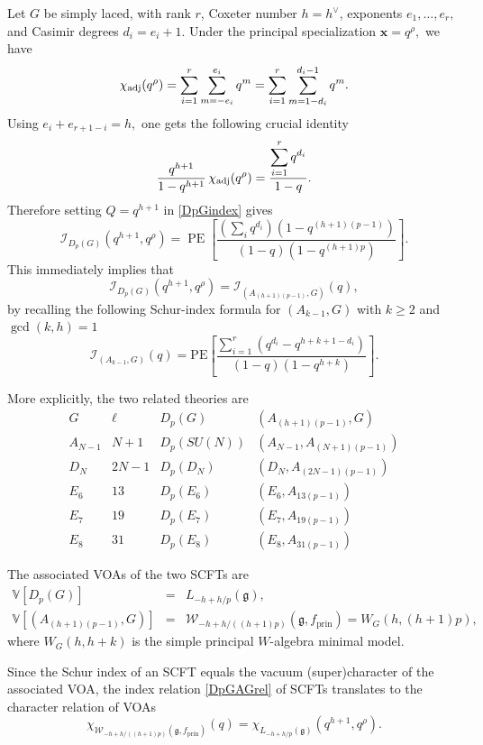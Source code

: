 \documentclass[a4paper,11pt]{article}
\theoremstyle{definition}
\theoremstyle{definition}
\theoremstyle{remark}
\newcommand{\prin}{ \text{prin}}
\newcommand{\be}{\begin{equation}}
\newcommand{\ee}{\end{equation}}
\newcommand{\beqn}{\begin{eqnarray}}
\newcommand{\eeqn}{\end{eqnarray}}
\begin{document}
Let $G$ be simply laced, with rank $r$, Coxeter number
$ h=h^\vee $, 
exponents
$
e_1,\ldots,e_r,
$
and Casimir degrees
$
d_i=e_i+1.
$
Under the principal specialization
$
\bm x=q^\rho,
$
we have
\be \chi_{\rm adj}(q^\rho)
=
\sum_{i=1}^r\sum_{m=-e_i}^{e_i}q^m
=
\sum_{i=1}^r\sum_{m=1 -d_i }^{d_i-1}q^m. \ee
Using
$
e_i+e_{r+1-i}=h,
$
one gets the following  crucial identity
\be \frac{q^{h+1}}{1-q^{h+1}}\,
\chi_{\rm adj}(q^\rho)
=
\frac{\displaystyle\sum_{i=1}^r q^{d_i}}{1-q}. \ee
Therefore setting $ Q=q^{h+1} $ in \eqref{DpGindex} 
gives
\be \mathcal I_{D_p(G)}
(q^{h+1},q^\rho)
=
\operatorname{PE}\!\left[
\frac{
\left(\sum_iq^{d_i}\right)
\left(1-q^{(h+1)(p-1)}\right)
}
{(1-q)(1-q^{(h+1)p})}
\right]. \ee
This immediately implies that 
\be\label{DpGAGrel}
\mathcal I_{D_p(G)}
(q^{h+1},q^\rho)
=
\mathcal I_{( A_{(h+1)(p-1)},G)}(q),
\ee
 by recalling the following Schur-index formula for $(A_{k-1},G)$ with $k\ge2$ and $\gcd(k,h)=1$ 
\be \label{IkG}
\mathcal{I}_{(A_{k-1}, G)}(q) = \mathrm{PE} \left[ \frac{\sum_{i=1}^r \left( q^{d_i} - q^{h+k+1-d_i} \right)}{(1 - q)(1 - q^{h+k})} \right].
\ee

More explicitly, the two related theories are 
 \be
\begin{array}{c|c|c|c}
G & \ell & D_p(G) &  ( A_{(h+1)(p-1)},G) \\ \hline
A_{N-1} &  N+1 & D_p(SU(N)) & (A_{N-1},A_{(N+1)(p-1)})\\
D_N &  2N-1 & D_p(D_N) & (D_N,A_{(2N-1)(p-1)})\\
E_6 &  13 & D_p(E_6) & (E_6,A_{13(p-1)})\\
E_7 &  19 & D_p(E_7) & (E_7,A_{19(p-1)})\\
E_8 &  31 & D_p(E_8) & (E_8,A_{31(p-1)})
\end{array}
\ee

The associated VOAs of the two SCFTs are     
\beqn
\mathbb V[D_p(G)] &=& L_{-h+h/p}(\mathfrak g),
\nonumber\\
\mathbb V[(A_{(h+1)(p-1)},G)] &=& \mathcal W_{-h+h/((h+1)p)}(\mathfrak g,f_{\prin})
 =  W_G(h,(h+1)p),
\eeqn
where $ {W}_G(h, h+k)$ is the simple principal $W$-algebra minimal model. 

Since the Schur index of an SCFT equals   the vacuum  (super)character of the associated VOA, the index relation \eqref{DpGAGrel}  of  SCFTs   translates to the character relation of VOAs
\be
\chi_{\mathcal W_{-h+h/((h+1)p)}(\mathfrak g,f_{\prin})}(q)  =  \chi_{L_{-h+h/p}(\mathfrak g)}(q^{h+1},q^\rho).
\ee

  
\end{document}
